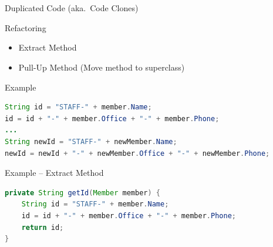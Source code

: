 \begin{frame}[fragile]
	\frametitle{\insertsubsection\ } %
	\begin{fancycolumns}
		\begin{definition}{Duplicated Code (aka.\ Code Clones)}
		\end{definition}
		\begin{definition}{Refactoring}
			\begin{itemize}
				\item Extract Method
				\item Pull-Up Method (Move method to superclass)
			\end{itemize}
		\end{definition}
		\nextcolumn
		\begin{example}{Example}
			\begin{lstlisting}[language=Java,basicstyle=\small]
String id = "STAFF-" + member.Name;
id = id + "-" + member.Office + "-" + member.Phone;
...
String newId = "STAFF-" + newMember.Name;
newId = newId + "-" + newMember.Office + "-" + newMember.Phone;
			\end{lstlisting}
		\end{example}
			\begin{example}{Example -- Extract Method}
				\begin{lstlisting}[language=Java, basicstyle=\small]
private String getId(Member member) {
	String id = "STAFF-" + member.Name;
	id = id + "-" + member.Office + "-" + member.Phone;
	return id;
}
			\end{lstlisting}
			\end{example}
	\end{fancycolumns}
\end{frame}

